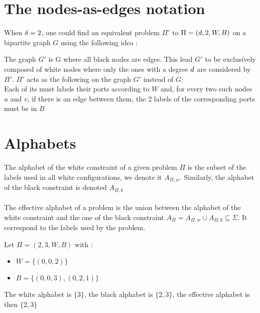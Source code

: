 \section{The nodes-as-edges notation}
When $\delta = 2$, one could find an equivalent problem $\Pi'$ to $\Pi = (d,2,W,B)$ on a bipartite graph $G$ using the following idea \cite{1}:

The graph $G'$ is G where all black nodes are edges. This lead $G'$ to be exclusively composed of white nodes where only the ones with a degree $d$ are considered by $\Pi'$.
$\Pi'$ acts as the following on the graph $G'$ instead of $G$:\\
Each of its must labels their ports according to $W$ and, for every two such nodes $u$ and $v$, if there is an edge between them, the 2 labels of the corresponding ports must be in $B$\\

\section{Alphabets}
The alphabet of the white constraint of a given problem $\Pi$ is the subset of the labels used in all white configurations, we denote it $A_{\Pi,w}$. Similarly, the alphabet of the black constraint is denoted $A_{\Pi,b}$\\\\
The effective alphabet of a problem is the union between the alphabet of the white constraint and the one of the black constraint $A_{\Pi} = A_{\Pi,w} \cup A_{\Pi,b} \subseteq \Sigma$. It correspond to the labels used by the problem.
\begin{exmp}
Let $\Pi = (2,3,W,B)$ with :
\begin{itemize}
    \item $W = \{(0,0,2)\}$
    \item $B = \{(0,0,3),(0,2,1)\}$
\end{itemize}
The white alphabet is $\{3\}$, the black alphabet is $\{2,3\}$, the effective alphabet is then $\{2,3\}$
\end{exmp}
